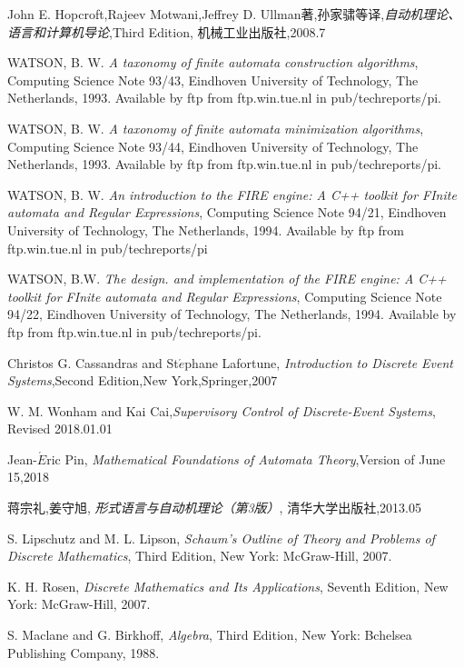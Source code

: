 \begin{thebibliography}{99}
	John E. Hopcroft,Rajeev Motwani,Jeffrey D. Ullman著,孙家骕等译,\textit{自动机理论、语言和计算机导论},Third Edition, 机械工业出版社,2008.7
	
	WATSON, B. W. \textit{A taxonomy of finite automata construction algorithms}, Computing Science Note 93/43, Eindhoven University of Technology, The Netherlands, 1993. Available by ftp from ftp.win.tue.nl in pub/techreports/pi.
	
	WATSON, B. W. \textit{A taxonomy of finite automata minimization algorithms}, Computing Science Note 93/44, Eindhoven University of Technology, The Netherlands, 1993. Available by ftp from ftp.win.tue.nl in pub/techreports/pi.
	
	WATSON, B. W. \textit{An introduction to the FIRE engine: A C++ toolkit for FInite automata and Regular Expressions}, Computing Science Note 94/21, Eindhoven University of Technology, The Netherlands, 1994. Available by ftp from ftp.win.tue.nl in pub/techreports/pi
	
	WATSON, B.W. \textit{The design. and implementation of the FIRE engine:	A C++ toolkit for FInite automata and Regular Expressions}, Computing Science Note 94/22, Eindhoven University of Technology, The Netherlands, 1994. Available by ftp from ftp.win.tue.nl in pub/techreports/pi.
	
	Christos G. Cassandras and St$\acute{e}$phane Lafortune, \textit{Introduction to Discrete Event Systems},Second Edition,New York,Springer,2007
	
	W. M. Wonham and Kai Cai,\textit{Supervisory Control of Discrete-Event Systems}, Revised 2018.01.01
	
	Jean-$\acute{E}$ric Pin, \textit{Mathematical Foundations of Automata Theory},Version of June 15,2018
	
	蒋宗礼,姜守旭, \textit{形式语言与自动机理论（第3版）}, 清华大学出版社,2013.05
	
	
	S. Lipschutz and M. L. Lipson, \textit{Schaum's Outline of Theory and Problems of Discrete Mathematics}, Third Edition, New York: McGraw-Hill, 2007.
	
	K. H. Rosen, \textit{Discrete Mathematics and Its Applications}, Seventh Edition, New York: McGraw-Hill, 2007.
	
	S. Maclane and G. Birkhoff, \textit{Algebra}, Third Edition, New York: Bchelsea Publishing Company, 1988.
\end{thebibliography}


